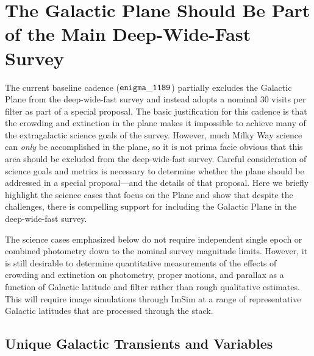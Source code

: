 %
%
%    
% 
%

\section{The Galactic Plane Should Be Part of the Main Deep-Wide-Fast Survey}
\def\secname{MW_Plane}\label{sec:\secname} %



The current baseline cadence (${\tt enigma\_1189}$) partially excludes the Galactic Plane from the deep-wide-fast survey and instead adopts a nominal 30 visits 
per filter as part of a special proposal. The basic justification for this cadence is that the crowding and extinction in the plane makes it impossible to 
achieve many of the extragalactic science goals of the survey. However, much Milky Way science can \emph{only} be accomplished in the plane, so it is not 
prima facie obvious that this area should be excluded from the deep-wide-fast survey. Careful consideration of science goals and metrics is necessary to 
determine whether the plane should be addressed in a special proposal---and the details of that proposal. Here we briefly highlight the science cases that 
focus on the Plane and show that despite the challenges, there is compelling support for including the Galactic Plane in the deep-wide-fast survey.

The science cases emphasized below do not require independent single epoch or combined photometry down to the nominal survey magnitude limits. However, it is 
still desirable to determine quantitative measurements of the effects of crowding and extinction on photometry, proper motions, and parallax as a function of 
Galactic latitude and filter rather than rough qualitative estimates. This will require image simulations through ImSim at a range of representative Galactic 
latitudes that are processed through the stack.

\subsection{Unique Galactic Transients and Variables}

